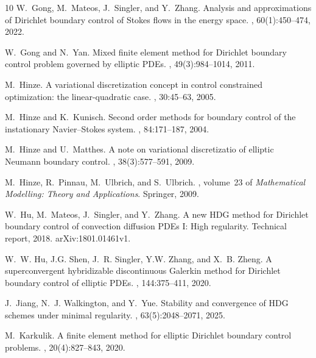 \documentclass[a4paper,10pt]{article}
\numberwithin{theorem}{section}
\begin{document}
\begin{thebibliography}{10}
W.~Gong, M.~Mateos, J.~Singler, and Y.~Zhang.
\newblock Analysis and approximations of {D}irichlet boundary control of
  {S}tokes flows in the energy space.
, 60(1):450--474, 2022.

W.~Gong and N.~Yan.
\newblock Mixed finite element method for {D}irichlet boundary control problem
  governed by elliptic {PDE}s.
, 49(3):984--1014, 2011.

M.~Hinze.
\newblock A variational discretization concept in control constrained
  optimization: the linear-quadratic case.
, 30:45--63, 2005.

M.~Hinze and K.~Kunisch.
\newblock Second order methods for boundary control of the instationary
  {N}avier--{S}tokes system.
, 84:171--187, 2004.

M.~Hinze and U.~Matthes.
\newblock A note on variational discretizatio of elliptic {N}eumann boundary
  control.
, 38(3):577--591, 2009.

M.~Hinze, R.~Pinnau, M.~Ulbrich, and S.~Ulbrich.
, volume~23 of {\em
  Mathematical Modelling: Theory and Applications}.
\newblock Springer, 2009.

W.~Hu, M.~Mateos, J.~Singler, and Y.~Zhang.
\newblock A new {HDG} method for {D}irichlet boundary control of convection
  diffusion {PDEs} {I}: High regularity.
\newblock Technical report, 2018.
\newblock arXiv:1801.01461v1.

W.~W. Hu, J.G. Shen, J.~R. Singler, Y.W. Zhang, and X.~B. Zheng.
\newblock A superconvergent hybridizable discontinuous {G}alerkin method for
  {D}irichlet boundary control of elliptic {PDEs}.
, 144:375--411, 2020.

J.~Jiang, N.~J. Walkington, and Y.~Yue.
\newblock Stability and convergence of {HDG} schemes under minimal regularity.
, 63(5):2048--2071, 2025.

M.~Karkulik.
\newblock A finite element method for elliptic {D}irichlet boundary control
  problems.
, 20(4):827--843, 2020.


\end{thebibliography}
\end{document}
